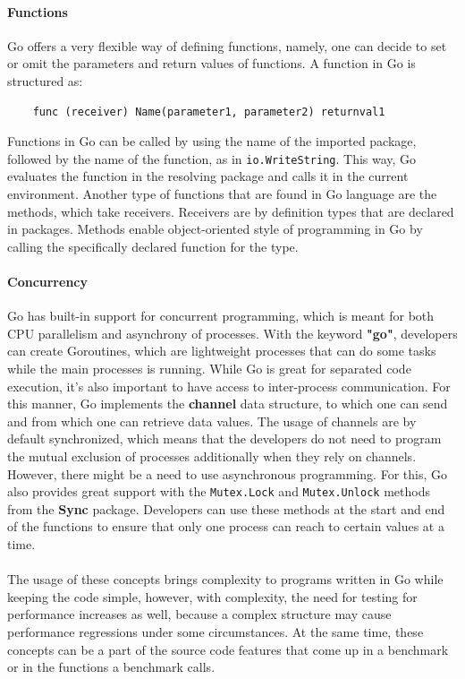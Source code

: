 \documentclass{seal_thesis}
\begin{document}
\paragraph{Functions} Go offers a very flexible way of defining functions, namely, one can decide to set or omit the parameters and return values of functions. A function in Go is structured as:\\
\begin{lstlisting}
	func (receiver) Name(parameter1, parameter2) returnval1
\end{lstlisting}

\noindent Functions in Go can be called by using the name of the imported package, followed by the name of the function, as in \texttt{io.WriteString}. This way, Go evaluates the function in the resolving package and calls it in the current environment. Another type of functions that are found in Go language are the methods, which take receivers. Receivers are by definition types that are declared in packages. Methods enable object-oriented style of programming in Go by calling the specifically declared function for the type.

\paragraph{Concurrency} Go has built-in support for concurrent programming, which is meant for both CPU parallelism and asynchrony of processes. With the keyword \textbf{"go"}, developers can create Goroutines, which are lightweight processes that can do some tasks while the main processes is running. While Go is great for separated code execution, it's also important to have access to inter-process communication. For this manner, Go implements the \textbf{channel} data structure, to which one can send and from which one can retrieve data values. The usage of channels are by default synchronized, which means that the developers do not need to program the mutual exclusion of processes additionally when they rely on channels. However, there might be a need to use asynchronous programming. For this, Go also provides great support with the \texttt{Mutex.Lock} and \texttt{Mutex.Unlock} methods from the \textbf{Sync} package. Developers can use these methods at the start and end of the functions to ensure that only one process can reach to certain values at a time.\\
\\
The usage of these concepts brings complexity to programs written in Go while keeping the code simple, however, with complexity, the need for testing for performance increases as well, because a complex structure may cause performance regressions under some circumstances. At the same time, these concepts can be a part of the source code features that come up in a benchmark or in the functions a benchmark calls.
\end{document}
